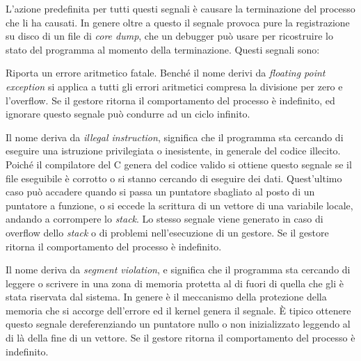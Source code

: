 L'azione predefinita per tutti questi segnali è causare la terminazione del
processo che li ha causati. In genere oltre a questo il segnale provoca pure
la registrazione su disco di un file di \textit{core dump}, che un debugger
può usare per ricostruire lo stato del programma al momento della
terminazione.  Questi segnali sono:
\begin{basedescript}{\desclabelwidth{2.0cm}}
\item[\signald{SIGFPE}] Riporta un errore aritmetico fatale. Benché il nome
  derivi da \textit{floating point exception} si applica a tutti gli errori
  aritmetici compresa la divisione per zero e l'overflow.  Se il gestore
  ritorna il comportamento del processo è indefinito, ed ignorare questo
  segnale può condurre ad un ciclo infinito.

  
\item[\signald{SIGILL}] Il nome deriva da \textit{illegal instruction},
  significa che il programma sta cercando di eseguire una istruzione
  privilegiata o inesistente, in generale del codice illecito. Poiché il
  compilatore del C genera del codice valido si ottiene questo segnale se il
  file eseguibile è corrotto o si stanno cercando di eseguire dei dati.
  Quest'ultimo caso può accadere quando si passa un puntatore sbagliato al
  posto di un puntatore a funzione, o si eccede la scrittura di un vettore di
  una variabile locale, andando a corrompere lo \textit{stack}. Lo stesso
  segnale viene generato in caso di overflow dello \textit{stack} o di
  problemi nell'esecuzione di un gestore.  Se il gestore ritorna il
  comportamento del processo è indefinito.

\item[\signald{SIGSEGV}] Il nome deriva da \textit{segment violation}, e
  significa che il programma sta cercando di leggere o scrivere in una zona di
  memoria protetta al di fuori di quella che gli è stata riservata dal
  sistema. In genere è il meccanismo della protezione della memoria che si
  accorge dell'errore ed il kernel genera il segnale.  È tipico ottenere
  questo segnale dereferenziando un puntatore nullo o non inizializzato
  leggendo al di là della fine di un vettore.  Se il gestore ritorna il
  comportamento del processo è indefinito.


\end{basedescript}
